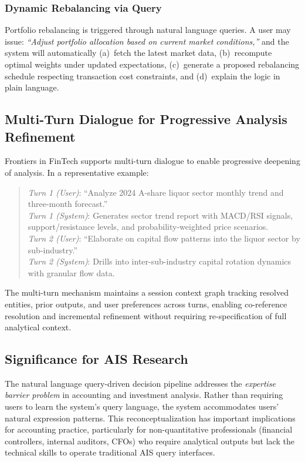 \documentclass[12pt,letterpaper]{article}
\begin{document}
\subsubsection{Dynamic Rebalancing via Query}

Portfolio rebalancing is triggered through natural language queries.
A user may issue: \textit{``Adjust portfolio allocation based on
current market conditions,''} and the system will automatically
(a)~fetch the latest market data, (b)~recompute optimal weights under
updated expectations, (c)~generate a proposed rebalancing schedule
respecting transaction cost constraints, and (d)~explain the logic in
plain language.

\subsection{Multi-Turn Dialogue for Progressive Analysis Refinement}

Frontiers in FinTech supports multi-turn dialogue to enable progressive deepening
of analysis.
In a representative example:
\begin{quote}
\textit{Turn 1 (User)}: ``Analyze 2024 A-share liquor sector monthly
trend and three-month forecast.''\\
\textit{Turn 1 (System)}: Generates sector trend report with MACD/RSI
signals, support/resistance levels, and probability-weighted price
scenarios.\\
\textit{Turn 2 (User)}: ``Elaborate on capital flow patterns into the
liquor sector by sub-industry.''\\
\textit{Turn 2 (System)}: Drills into inter-sub-industry capital
rotation dynamics with granular flow data.
\end{quote}
The multi-turn mechanism maintains a session context graph tracking
resolved entities, prior outputs, and user preferences across turns,
enabling co-reference resolution and incremental refinement without
requiring re-specification of full analytical context.

\subsection{Significance for AIS Research}

The natural language query-driven decision pipeline addresses the
\emph{expertise barrier problem} in accounting and investment analysis.
Rather than requiring users to learn the system's query language, the
system accommodates users' natural expression patterns.
This reconceptualization has important implications for accounting
practice, particularly for non-quantitative professionals (financial
controllers, internal auditors, CFOs) who require analytical outputs
but lack the technical skills to operate traditional AIS query
interfaces.
\end{document}
